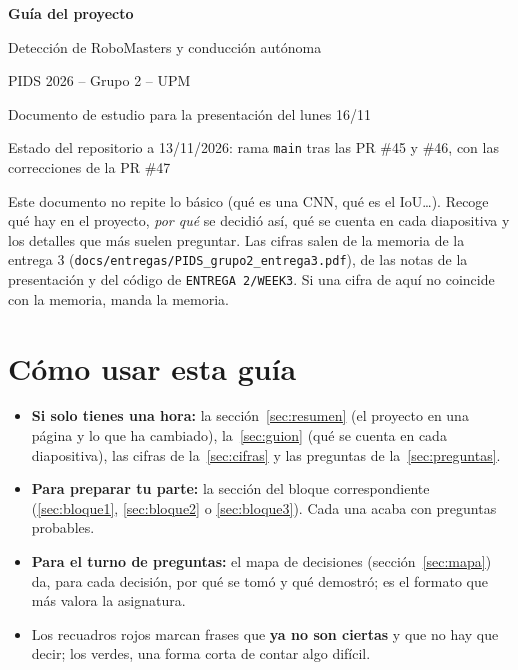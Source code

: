\documentclass[11pt,a4paper]{article}
\newcommand{\cod}[1]{\texttt{#1}}
\begin{document}
\begin{titlepage}
\centering
\vspace*{3cm}
{\Huge\bfseries\color{azul} Guía del proyecto\par}
\vspace{0.5cm}
{\Large Detección de RoboMasters y conducción autónoma\par}
\vspace{0.3cm}
{\large PIDS 2026 -- Grupo 2 -- UPM\par}
\vspace{2cm}
Documento de estudio para la presentación del lunes 16/11\par
\vspace{0.3cm}
Estado del repositorio a 13/11/2026: rama \cod{main} tras las PR \#45 y \#46, con las correcciones de la PR \#47\par
\vfill
\begin{minipage}{0.84\textwidth}
\small
Este documento no repite lo básico (qué es una CNN, qué es el IoU\ldots). Recoge qué hay en el proyecto, \emph{por qué} se decidió así, qué se cuenta en cada diapositiva y los detalles que más suelen preguntar. Las cifras salen de la memoria de la entrega 3 (\cod{docs/\allowbreak{}entregas/\allowbreak{}PIDS\_\allowbreak{}grupo2\_\allowbreak{}entrega3.pdf}), de las notas de la presentación y del código de \cod{ENTREGA 2/\allowbreak{}WEEK3}. Si una cifra de aquí no coincide con la memoria, manda la memoria.
\end{minipage}
\vfill
\end{titlepage}

\tableofcontents
\newpage

\section*{Cómo usar esta guía}

\begin{itemize}
  \item \textbf{Si solo tienes una hora:} la sección~\ref{sec:resumen} (el proyecto en una página y lo que ha cambiado), la~\ref{sec:guion} (qué se cuenta en cada diapositiva), las cifras de la~\ref{sec:cifras} y las preguntas de la~\ref{sec:preguntas}.
  \item \textbf{Para preparar tu parte:} la sección del bloque correspondiente (\ref{sec:bloque1}, \ref{sec:bloque2} o \ref{sec:bloque3}). Cada una acaba con preguntas probables.
  \item \textbf{Para el turno de preguntas:} el mapa de decisiones (sección~\ref{sec:mapa}) da, para cada decisión, por qué se tomó y qué demostró; es el formato que más valora la asignatura.
  \item Los recuadros \colorbox{rojo}{rojos} marcan frases que \textbf{ya no son ciertas} y que no hay que decir; los \colorbox{verde}{verdes}, una forma corta de contar algo difícil.
\end{itemize}
\end{document}

